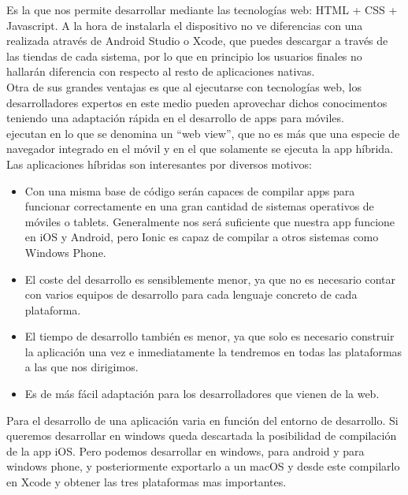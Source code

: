 \documentclass[a4paper, 11pt]{article}
\begin{document}
\begin{itemize}
            Es la que nos permite desarrollar mediante las tecnologías web: HTML +
            CSS + Javascript. A la hora de instalarla el dispositivo no ve
            diferencias con una realizada através de Android Studio o Xcode, que
            puedes descargar a través de las tiendas de cada sistema, por lo que en
            principio los usuarios finales no hallarán diferencia con respecto al
            resto de aplicaciones nativas.\\

            Otra de sus grandes ventajas es que al ejecutarse con tecnologías web,
            los desarrolladores expertos en este medio pueden aprovechar dichos
            conocimentos teniendo una adaptación rápida en el desarrollo de apps
            para móviles.\\

            ejecutan en lo que se denomina un “web view”, que no es más que una
            especie de navegador integrado en el móvil y en el que solamente se
            ejecuta la app híbrida.\\

            Las aplicaciones híbridas son interesantes por diversos motivos:
            \begin{itemize}
                \item{Con una misma base de código serán capaces de compilar apps
                para funcionar correctamente en una gran cantidad de sistemas
                operativos de móviles o tablets. Generalmente nos será suficiente
                que nuestra app funcione en iOS y Android, pero Ionic es capaz de
                compilar a otros sistemas como Windows Phone.}
                \item{El coste del desarrollo es sensiblemente menor, ya que no es
                necesario contar con varios equipos de desarrollo para cada lenguaje
                concreto de cada plataforma.}
                \item{El tiempo de desarrollo también es menor, ya que solo es
                necesario construir la aplicación una vez e inmediatamente la
                tendremos en todas las plataformas a las que nos dirigimos.}
                \item {Es de más fácil adaptación para los desarrolladores que
                vienen de la web.}
            \end{itemize}

            Para el desarrollo de una aplicación varia en función del entorno de
            desarrollo. Si queremos desarrollar en windows queda descartada la
            posibilidad de compilación de la app iOS. Pero podemos desarrollar en
            windows, para android y para windows phone, y posteriormente exportarlo
            a un macOS y desde este compilarlo en Xcode y obtener las tres
            plataformas mas importantes.\\


\end{itemize}
\end{document}
